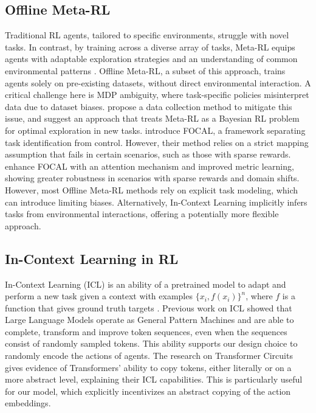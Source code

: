 \subsection{Offline Meta-RL}
Traditional RL agents, tailored to specific environments, struggle with novel tasks. In contrast, by training across a diverse array of tasks, Meta-RL equips agents with adaptable exploration strategies and an understanding of common environmental patterns \citep{duan2016rl, wang2016learning, rajeswaran2017towards, zhang2018dissection, team2021open, nikulin2023xlandminigrid}. Offline Meta-RL, a subset of this approach, trains agents solely on pre-existing datasets, without direct environmental interaction. A critical challenge here is MDP ambiguity, where task-specific policies misinterpret data due to dataset biases. \citet{dorfman2021offline} propose a data collection method to mitigate this issue, and suggest an approach that treats Meta-RL as a Bayesian RL problem for optimal exploration in new tasks. \citet{li2020focal} introduce FOCAL, a framework separating task identification from control. However, their method relies on a strict mapping assumption that fails in certain scenarios, such as those with sparse rewards. \citet{li2021provably} enhance FOCAL with an attention mechanism and improved metric learning, showing greater robustness in scenarios with sparse rewards and domain shifts. However, most Offline Meta-RL methods rely on explicit task modeling, which can introduce limiting biases. Alternatively, In-Context Learning implicitly infers tasks from environmental interactions, offering a potentially more flexible approach.


\subsection{In-Context Learning in RL}
In-Context Learning (ICL) is an ability of a pretrained model to adapt and perform a new task given a context with examples $\{x_i, f(x_i)\}^n$, where $f$ is a function that gives ground truth targets \cite{brown2020language, wang2023images}. Previous work on ICL \cite{mirchandani2023large} showed that Large Language Models operate as General Pattern Machines and are able to complete, transform and improve token sequences, even when the sequences consist of randomly sampled tokens. This ability supports our design choice to randomly encode the actions of agents. The research on Transformer Circuits \cite{elhage2021mathematical} gives evidence of Transformers' ability to copy tokens, either literally or on a more abstract level, explaining their ICL capabilities. This is particularly useful for our model, which explicitly incentivizes an abstract copying of the action embeddings.

